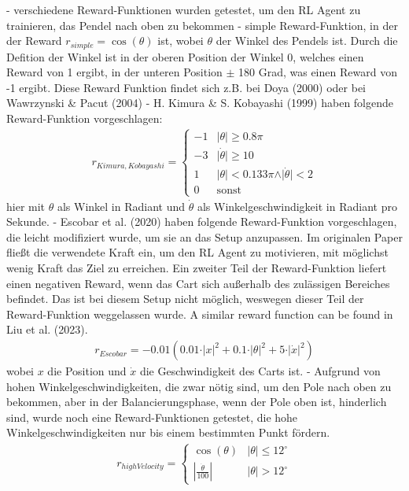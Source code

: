 - verschiedene Reward-Funktionen wurden getestet, um den RL Agent zu trainieren, das Pendel nach oben zu bekommen
- simple Reward-Funktion, in der der Reward $r_{simple}=\cos(\theta)$ ist, wobei $\theta$ der Winkel des Pendels ist. Durch die Defition der Winkel ist in der oberen Position der Winkel 0, welches einen Reward von 1 ergibt, in der unteren Position $\pm$ 180 Grad, was einen Reward von -1 ergibt. Diese Reward Funktion findet sich z.B. bei Doya (2000) oder bei Wawrzynski & Pacut (2004)
- H. Kimura & S. Kobayashi (1999) haben folgende Reward-Funktion vorgeschlagen: \begin{align}
    r_{Kimura,Kobayashi} = \begin{cases}
        -1 & \vert\theta\vert \ge 0.8\pi \\
        -3 & \vert\dot{\theta}\vert \ge 10 \\
        1 & \vert\theta\vert < 0.133\pi \land \vert\dot{\theta}\vert < 2 \\ 
        0 & \text{sonst}
    \end{cases}
\end{align} hier mit $\theta$ als Winkel in Radiant und $\dot{\theta}$ als Winkelgeschwindigkeit in Radiant pro Sekunde.
- Escobar et al. (2020) haben folgende Reward-Funktion vorgeschlagen, die leicht modifiziert wurde, um sie an das Setup anzupassen. Im originalen Paper fließt die verwendete Kraft ein, um den RL Agent zu motivieren, mit möglichst wenig Kraft das Ziel zu erreichen. Ein zweiter Teil der Reward-Funktion liefert einen negativen Reward, wenn das Cart sich außerhalb des zulässigen Bereiches befindet. Das ist bei diesem Setup nicht möglich, weswegen dieser Teil der Reward-Funktion weggelassen wurde. A similar reward function can be found in Liu et al. (2023). \begin{align}
    r_{Escobar} = -0.01\left(0.01\cdot\vert x\vert^2 + 0.1\cdot\vert\theta\vert^2 + 5\cdot\vert \dot{x}\vert^2\right)
\end{align} wobei $x$ die Position und $\dot{x}$ die Geschwindigkeit des Carts ist. 
- Aufgrund von hohen Winkelgeschwindigkeiten, die zwar nötig sind, um den Pole nach oben zu bekommen, aber in der Balancierungsphase, wenn der Pole oben ist, hinderlich sind, wurde noch eine Reward-Funktionen getestet, die hohe Winkelgeschwindigkeiten nur bis einem bestimmten Punkt fördern. \begin{align}
    r_{highVelocity} = \begin{cases}
        \cos(\theta) & \vert\theta\vert \le 12^\circ \\
        \left|\frac{\dot{\theta}}{100}\right| & \vert\theta\vert > 12^\circ
    \end{cases}
\end{align}

